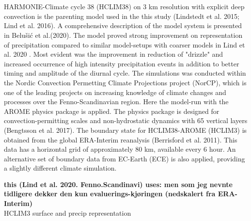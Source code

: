 \\
\\
HARMONIE-Climate cycle 38 (HCLIM38) on 3 km resolution with explicit deep convection is the parenting model used in the this study (Lindstedt et al. 2015\cite{lindstedt_hclim}; Lind et al. 2016\cite{lind_hclim}). A comprehensive description of the model system is presented in Belušić et al.(2020)\cite{belusic_hclim}. The model proved strong improvement on representation of precipitation compared to similar model-setups with coarser models in Lind et al. 2020 \cite{lind_arome}. Most evident was the improvement in reduction of "drizzle" and increased occurrence of high intensity precipitation events in addition to better timing and amplitude of the diurnal cycle. The simulations was conducted within the Nordic Convection Permetting Climate Projections project (NorCP), which is one of the leading projects on increasing knowledge of climate changes and processes over the Fenno-Scandinavian region. Here the model-run with the AROME physics package is applied. The physics package is designed for convection-permitting scales and non-hydrostatic dynamics with 65 vertical layers (Bengtsson et al. 2017)\cite{bengtsson_arome}. The boundary state for HCLIM38-AROME (HCLIM3) is obtained from the global ERA-Interim reanalysis (Berrisford et al. 2011)\cite{erai}. This data has a horizontal grid of approximately 80 km, available every 6 hour. An alternative set of boundary data from EC-Earth (ECE) is also applied, providing a slightly different climate simulation.    

\textbf{this (Lind et al. 2020. Fenno.Scandinavi) uses: men som jeg nevnte tidligere dekker den kun evaluerings-kjøringen (nedskalert fra ERA-Interim)}
\\
HCLIM3
surface and precip representation




